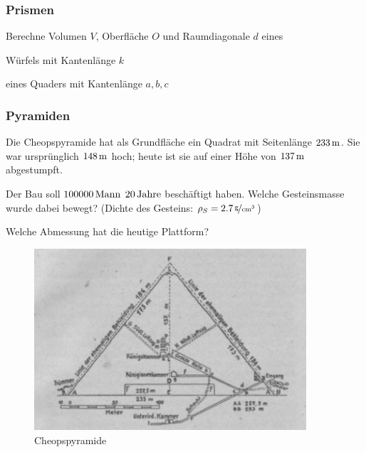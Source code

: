 \documentclass[%
11pt,%
twoside,%
titlepage,%
a4page,%
german,%
headsepline%
]{scrartcl}
\begin{document}
\subsubsection{Prismen}
\begin{ueb}
Berechne Volumen $V$, Oberfl\"ache $O$ und Raumdiagonale $d$ eines
\begin{enumeratea}
\item W\"urfels mit Kantenl\"ange $k$
\item eines Quaders mit Kantenl\"ange $a,b,c$
\end{enumeratea}
\end{ueb}

\subsubsection{Pyramiden}
\begin{ueb}
Die Cheopspyramide hat als Grundfl\"ache ein Quadrat mit Seitenl\"ange $\unit[233]{m}$. Sie war urspr\"unglich $\unit[148]{m}$ hoch; heute ist sie auf einer H\"ohe von $\unit[137]{m}$ abgestumpft.
\begin{enumeratea}
\item Der Bau soll $\unit[100000]{Mann}$ $\unit[20]{Jahre}$ besch\"aftigt haben. Welche Gesteinsmasse wurde dabei bewegt? (Dichte des Gesteins: $\rho_S=\unitfrac[2.7]{g}{cm^3}$)
\item Welche Abmessung hat die heutige Plattform?
\end{enumeratea}

\begin{figure}[h!]
\begin{center}
\includegraphics[width=0.9\textwidth]{pictures/cheops}
\caption{Cheopspyramide}
\end{center}
\end{figure}

\end{ueb}
\end{document}
